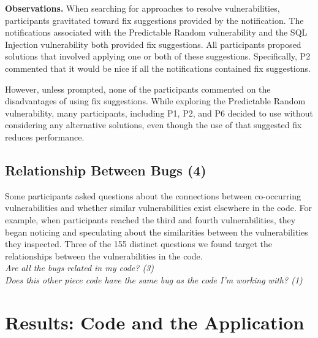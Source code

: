 \documentclass[conference]{IEEEtran}
\begin{document}
\noindent\textbf{Observations.}
When searching for approaches to resolve vulnerabilities, participants gravitated toward fix suggestions provided by the notification.
The notifications associated with the Predictable Random vulnerability and the SQL Injection vulnerability both provided fix suggestions.
All participants proposed solutions that involved applying one or both of these suggestions. 
Specifically, P2 commented that it would be nice if all the notifications contained fix suggestions.

However, unless prompted, none of the participants commented on the disadvantages of using fix suggestions.
While exploring the Predictable Random vulnerability, many participants, including P1, P2, and P6 decided to use  without considering any alternative solutions, even though the use of that suggested fix reduces performance.
\\



\noindent\subsection{\textbf{Relationship Between Bugs (4)}}\label{rbb}

Some participants asked questions about the connections between co-occurring vulnerabilities and whether similar vulnerabilities exist elsewhere in the code. 
For example, when participants reached the third and fourth vulnerabilities, they began noticing and speculating about the similarities between the vulnerabilities they inspected.
Three of the 155 distinct questions we found target the relationships between the vulnerabilities in the code. 
\\

\noindent\emph{Are all the bugs related in my code? (3)} \\
\emph{Does this other piece code have the same bug as the code I'm working with? (1)} \\




\section{Results: Code and the Application}
\label{sec:results-ca}

\end{document}
